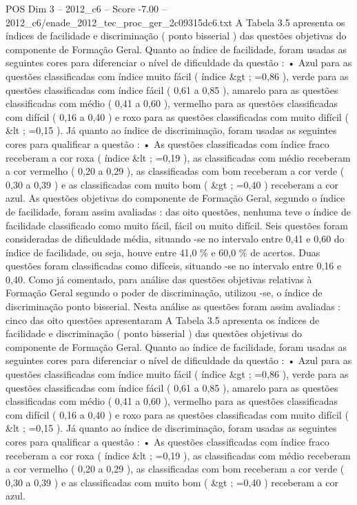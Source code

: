 \begin{textsample}{POS Dim 3 – 2012\_c6 – Score -7.00 – 2012\_c6/enade\_2012\_tec\_proc\_ger\_2c09315dc6.txt}
A Tabela 3.5 apresenta os índices de facilidade e discriminação ( ponto bisserial ) das questões objetivas do componente de Formação Geral.
Quanto ao índice de facilidade, foram usadas as seguintes cores para diferenciar o nível de dificuldade da questão : • Azul para as questões classificadas com índice muito fácil ( índice \&gt ; =0,86 ), verde para as questões classificadas com índice fácil ( 0,61 a 0,85 ), amarelo para as questões classificadas com médio ( 0,41 a 0,60 ), vermelho para as questões classificadas com difícil ( 0,16 a 0,40 ) e roxo para as questões classificadas com muito difícil ( \&lt ; =0,15 ).
Já quanto ao índice de discriminação, foram usadas as seguintes cores para qualificar a questão : • As questões classificadas com índice fraco receberam a cor roxa ( índice \&lt ; =0,19 ), as classificadas com médio receberam a cor vermelho ( 0,20 a 0,29 ), as classificadas com bom receberam a cor verde ( 0,30 a 0,39 ) e as classificadas com muito bom ( \&gt ; =0,40 ) receberam a cor azul.
As questões objetivas do componente de Formação Geral, segundo o índice de facilidade, foram assim avaliadas : das oito questões, nenhuma teve o índice de facilidade classificado como muito fácil, fácil ou muito difícil.
Seis questões foram consideradas de dificuldade média, situando -se no intervalo entre 0,41 e 0,60 do índice de facilidade, ou seja, houve entre 41,0 \% e 60,0 \% de acertos.
Duas questões foram classificadas como difíceis, situando -se no intervalo entre 0,16 e 0,40.
Como já comentado, para análise das questões objetivas relativas à Formação Geral segundo o poder de discriminação, utilizou -se, o índice de discriminação ponto bisserial.
Nesta análise as questões foram assim avaliadas : cinco das oito questões apresentaram A Tabela 3.5 apresenta os índices de facilidade e discriminação ( ponto bisserial ) das questões objetivas do componente de Formação Geral.
Quanto ao índice de facilidade, foram usadas as seguintes cores para diferenciar o nível de dificuldade da questão : • Azul para as questões classificadas com índice muito fácil ( índice \&gt ; =0,86 ), verde para as questões classificadas com índice fácil ( 0,61 a 0,85 ), amarelo para as questões classificadas com médio ( 0,41 a 0,60 ), vermelho para as questões classificadas com difícil ( 0,16 a 0,40 ) e roxo para as questões classificadas com muito difícil ( \&lt ; =0,15 ).
Já quanto ao índice de discriminação, foram usadas as seguintes cores para qualificar a questão : • As questões classificadas com índice fraco receberam a cor roxa ( índice \&lt ; =0,19 ), as classificadas com médio receberam a cor vermelho ( 0,20 a 0,29 ), as classificadas com bom receberam a cor verde ( 0,30 a 0,39 ) e as classificadas com muito bom ( \&gt ; =0,40 ) receberam a cor azul.

\end{textsample}
